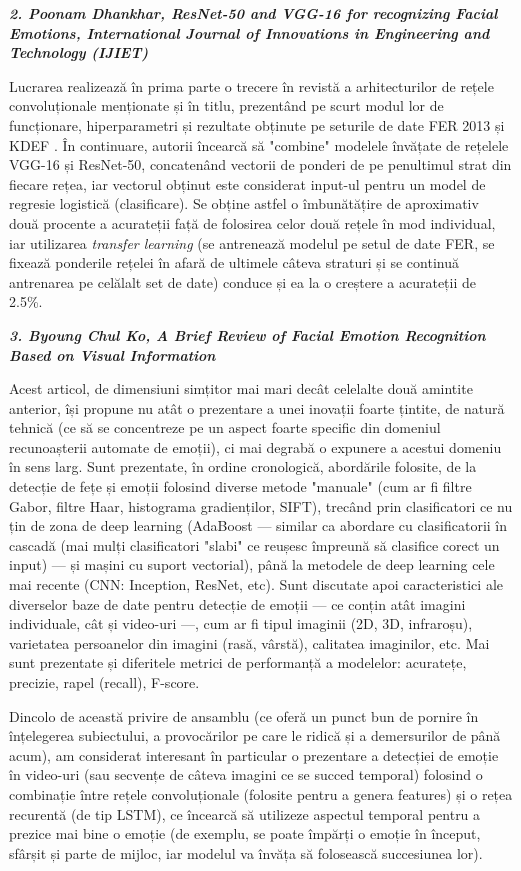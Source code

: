 \documentclass{article}
\begin{document}
\textit{\textbf{2. Poonam Dhankhar, ResNet-50 and VGG-16 for recognizing Facial Emotions, International Journal of Innovations in Engineering and Technology (IJIET)}}

Lucrarea realizează în prima parte o trecere în revistă a arhitecturilor de rețele convoluționale menționate și în titlu, prezentând pe scurt modul lor de funcționare, hiperparametri și rezultate obținute pe seturile de date FER 2013 și KDEF \cite{kdeflink}. În continuare, autorii încearcă să "combine" modelele învățate de rețelele VGG-16 și ResNet-50, concatenând vectorii de ponderi de pe penultimul strat din fiecare rețea, iar vectorul obținut este considerat input-ul pentru un model de regresie logistică (clasificare). Se obține astfel o îmbunătățire de aproximativ două procente a acurateții față de folosirea celor două rețele în mod individual, iar utilizarea \textit{transfer learning} (se antrenează modelul pe setul de date FER, se fixează ponderile rețelei în afară de ultimele câteva straturi și se continuă antrenarea pe celălalt set de date) conduce și ea la o creștere a acurateții de 2.5\%.

\textit{\textbf{3. Byoung Chul Ko, A Brief Review of Facial Emotion Recognition Based on Visual Information}} 

Acest articol, de dimensiuni simțitor mai mari decât celelalte două amintite anterior, își propune nu atât o prezentare a unei inovații foarte țintite, de natură tehnică (ce să se concentreze pe un aspect foarte specific din domeniul recunoașterii automate de emoții), ci mai degrabă o expunere a acestui domeniu în sens larg. Sunt prezentate, în ordine cronologică, abordările folosite, de la detecție de fețe și emoții folosind diverse metode "manuale" (cum ar fi filtre Gabor, filtre Haar, histograma gradienților, SIFT), trecând prin clasificatori ce nu țin de zona de deep learning (AdaBoost --- similar ca abordare cu clasificatorii în cascadă (mai mulți clasificatori "slabi" ce reușesc împreună să clasifice corect un input) --- și mașini cu suport vectorial), până la metodele de deep learning cele mai recente (CNN: Inception, ResNet, etc). Sunt discutate apoi caracteristici ale diverselor baze de date pentru detecție de emoții --- ce conțin atât imagini individuale, cât și video-uri ---, cum ar fi tipul imaginii (2D, 3D, infraroșu), varietatea persoanelor din imagini (rasă, vârstă), calitatea imaginilor, etc. Mai sunt prezentate și diferitele metrici de performanță a modelelor: acuratețe, precizie, rapel (recall), F-score. 

Dincolo de această privire de ansamblu (ce oferă un punct bun de pornire în înțelegerea subiectului, a provocărilor pe care le ridică și a demersurilor de până acum), am considerat interesant în particular o prezentare a detecției de emoție în video-uri (sau secvențe de câteva imagini ce se succed temporal) folosind o combinație între rețele convoluționale (folosite pentru a genera features) și o rețea recurentă (de tip LSTM), ce încearcă să utilizeze aspectul temporal pentru a prezice mai bine o emoție (de exemplu, se poate împărți o emoție în început, sfârșit și parte de mijloc, iar modelul va învăța să folosească succesiunea lor).
\end{document}
